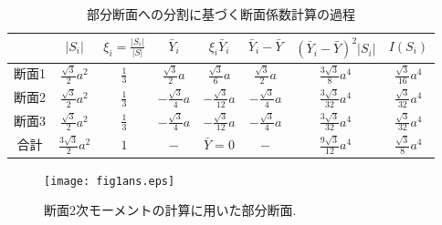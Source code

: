 \documentclass[10pt,a4j]{jarticle}
\begin{document}
\begin{table}
\begin{center}
	\caption{部分断面への分割に基づく断面係数計算の過程}
	\begin{tabular}{c||c|c|c|c|c|c|c}
		&
		$\left| S_i \right|$ & 
		$ \xi_i=\frac{\left| S_i \right|}{\left| S\right|} $  &
		$ \bar{Y}_i $ & 
		$ \xi_i\bar{Y}_i $ & 
		$\bar{Y}_i -\bar Y$ & 
		$ \left(\bar{Y}_i -\bar Y\right)^2\left| S_i \right|$ & 
		$ I(S_i)$  
		\\
		\hline 
		\hline 
		断面1&	
		$\frac{\sqrt{3}}{2}a^2$ & 
		$\frac{1}{3}$  &
		$\frac{\sqrt{3}}{2}a$ & 
		$\frac{\sqrt{3}}{6}a$ & 
		$\frac{\sqrt{3}}{2}a$ & 
		$\frac{3\sqrt{3}}{8}a^4$ &
		$\frac{\sqrt{3}}{16}a^4$ 
		\\
		\hline
		断面2&	
		$\frac{\sqrt{3}}{2}a^2$ & 
		$\frac{1}{3}$  &
		$-\frac{\sqrt{3}}{4}a$ & 
		$-\frac{\sqrt{3}}{12}a $ & 
		$-\frac{\sqrt{3}}{4}a$ & 
		$\frac{3\sqrt{3}}{32}a^4$ &
		$\frac{\sqrt{3}}{32}a^4$ 
		\\
		\hline 
		断面3&	
		$\frac{\sqrt{3}}{2}a^2$ & 
		$\frac{1}{3}$  &
		$-\frac{\sqrt{3}}{4}a$ & 
		$-\frac{\sqrt{3}}{12}a $ & 
		$-\frac{\sqrt{3}}{4}a$ & 
		$\frac{3\sqrt{3}}{32}a^4$ &
		$\frac{\sqrt{3}}{32}a^4$ 
		\\
		\hline 
		\hline 
		合計&	
		$\frac{3\sqrt{3}}{2}a^2$ & 
		$1$  &
		$-$ & 
		$\bar Y=0 $ & 
		$-$ & 
		$\frac{9\sqrt{3}}{12}a^4$ & 
		$\frac{\sqrt{3}}{8}a^4$ 
	\end{tabular}
\label{tbl:tbl2}
\end{center}
\end{table}
\begin{figure}[h]
	\begin{center}
	\texttt{[image: fig1ans.eps]} 
	\end{center}
	\caption{断面2次モーメントの計算に用いた部分断面.} 
	\label{fig:fig1}
\end{figure}
\end{document}
